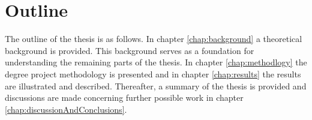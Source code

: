 \documentclass{kththesis}
\newcommand{\fbcomment}[1]{{#1}}
\renewcommand{\fbcomment}[1]{}
\begin{document}

\section{Outline}
\fbcomment{\color{red}Goal: Introduce the outline of the report (Will probably be a bit more specific in the final version of the report)}
The outline of the thesis is as follows. In chapter \ref{chap:background} a theoretical background is provided. This background serves as a foundation for understanding the remaining parts of the thesis. In chapter \ref{chap:methodlogy} the degree project methodology is presented and in chapter \ref{chap:results} the results are illustrated and described. Thereafter, a summary of the thesis is provided and discussions are made concerning further possible work in chapter \ref{chap:discussionAndConclusions}.
 
\end{document}
